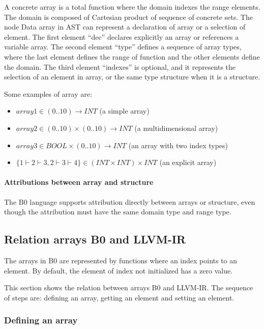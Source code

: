 \documentclass[10pt,a4paper]{article}
\begin{document}
A concrete array is a total function where the domain indexes the range 
elements. The domain is composed of Cartesian product of sequence of concrete 
sets. The node Data array in AST can represent a declaration of array or a 
selection of element. The first element ``dec'' declares explicitly an array or 
references a variable array. The second element ``type'' defines a sequence of 
array types, where the last element defines the range of function and the other 
elements define the domain. The third element ``indexes'' is optional, and it 
represents the selection of an element in array, or the same type structure 
when it is a structure.

Some examples of array are:
\begin{itemize}
	\item $array1 \in (0..10) \to INT $	(a simple array)
	\item $array2 \in (0..10) \times (0..10) \to INT $   (a multidimensional array)
	\item $array3 \in BOOL \times (0..10) \to INT$ (an array with two index types)
	\item $\{1\vdash2\vdash3, 2\vdash3\vdash4\}  \in (INT \times INT) \times INT$ (an explicit array)
\end{itemize} 

\paragraph{Attributions between array and structure}


The B0 language supports attribution directly between arrays or structure, even though the attribution
must have the same domain type and range type.

\subsection{Relation arrays B0 and LLVM-IR}

The arrays in B0 are represented by functions where an index points to an 
element. By default, the element of index not initialized has a zero value. 

This section shows the relation between arrays B0 and LLVM-IR. The sequence of
steps are: defining  an array, getting an element and setting an
element.

\subsubsection{Defining an array}
\end{document}
